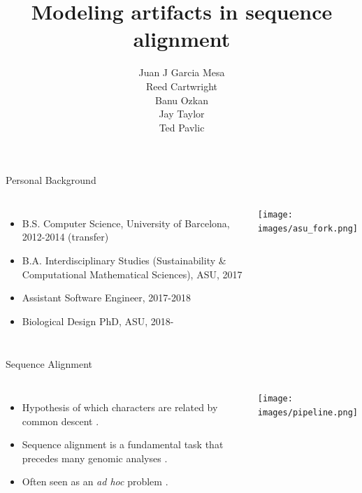 \documentclass{beamer}
\title[Artifacts in Sequence Alignment]{Modeling artifacts in sequence alignment}
\author[JJ Garcia Mesa]{Juan J Garcia Mesa\\ \vspace{2em}
						{\small Reed Cartwright\\
						Banu Ozkan\\
						Jay Taylor\\
						Ted Pavlic}}
\date{}
\newcommand{\green}[1]{\textcolor{green}{#1}}
\begin{document}
\maketitle

\begin{frame}{Personal Background} %
\begin{columns}
\begin{itemize}
	\setlength\itemsep{1em}
	\item B.S. Computer Science, University of Barcelona, 2012-2014 (transfer)
	\item B.A. Interdisciplinary Studies (Sustainability \& Computational
		Mathematical Sciences), ASU, 2017
	\item Assistant Software Engineer, 2017-2018
	\item Biological Design PhD, ASU, 2018-
\end{itemize}
\texttt{[image: images/asu\_fork.png]}
\end{columns}
\end{frame} %

\begin{frame}{Sequence Alignment} %
\begin{columns}
\begin{itemize}
	\setlength\itemsep{1em}
	\item Hypothesis of which characters are related by common descent \parencite{problems_cartwright_2009}.
	\item Sequence alignment is a fundamental task that precedes many genomic
			analyses \parencite{sequence_alignment_rosenberg_2009}.
	\item Often seen as an \textit{ad hoc} problem \cite{morrison_MSA_2018}.
\end{itemize}
\texttt{[image: images/pipeline.png]}
\end{columns}
\end{frame} %
\end{document}
